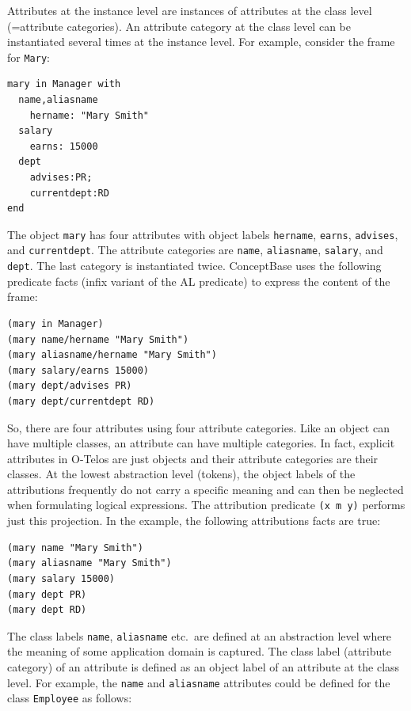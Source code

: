 Attributes at the instance level are instances of attributes at the class level 
(=attribute categories). An attribute category at the class level can be instantiated
several times at the instance level. For example, consider the frame for {\tt Mary}:

\begin{verbatim}
mary in Manager with
  name,aliasname
    hername: "Mary Smith"
  salary
    earns: 15000
  dept
    advises:PR;
    currentdept:RD
end
\end{verbatim}

The object {\tt mary} has four attributes with object labels 
{\tt hername}, {\tt earns}, {\tt advises}, and {\tt current\-dept}.
The attribute categories are {\tt name}, {\tt aliasname}, {\tt salary}, and {\tt dept}. The last category
is instantiated twice. ConceptBase uses the following predicate facts (infix variant of the AL predicate)
to express the content of the frame:

\begin{verbatim}
(mary in Manager)
(mary name/hername "Mary Smith")
(mary aliasname/hername "Mary Smith")
(mary salary/earns 15000)
(mary dept/advises PR)
(mary dept/currentdept RD)
\end{verbatim}

So, there are four attributes using four attribute categories. Like an object can have multiple classes,
an attribute can have multiple categories. In fact, explicit attributes in O-Telos are just
objects and their attribute categories are their classes. 
At the lowest abstraction level (tokens), 
the object labels of the attributions frequently do not carry a specific meaning and
can then be neglected when formulating logical expressions. 
The attribution predicate {\tt (x m y)} performs just this projection.
In the example, the following attributions facts are true:

\begin{verbatim}
(mary name "Mary Smith")
(mary aliasname "Mary Smith")
(mary salary 15000)
(mary dept PR)
(mary dept RD)
\end{verbatim}

The class labels {\tt name}, {\tt aliasname} etc.\ are defined at an abstraction level where
the meaning of some application domain is captured. 
The class label (attribute category) of an attribute is
defined as an object label of an attribute at the class level. For example, the {\tt name}
and {\tt aliasname} attributes could be defined for the class {\tt Employee} as follows:

